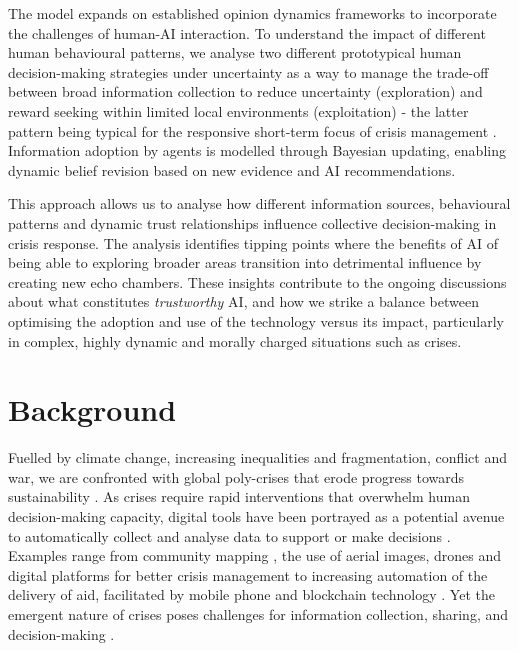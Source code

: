 \documentclass[pdflatex,sn-apa]{sn-jnl}%
\begin{document}
The model expands on established opinion dynamics frameworks \citep{geschke2019triple} to incorporate the challenges of human-AI interaction. To understand the impact of different human behavioural patterns, we analyse two different prototypical human decision-making strategies under uncertainty as a way to manage the trade-off between broad information collection to reduce uncertainty (exploration) and reward seeking within limited local environments (exploitation) - the latter pattern being typical for the responsive short-term focus of crisis management \citep{comes2020coordination}. Information adoption by agents is modelled through Bayesian updating, enabling dynamic belief revision based on new evidence and AI recommendations.

This approach allows us to analyse how different information sources, behavioural patterns and dynamic trust relationships influence collective decision-making in crisis response. The analysis identifies tipping points where the benefits of AI of being able to exploring broader areas transition into detrimental influence by creating new echo chambers. These insights contribute to the ongoing discussions about what constitutes \textit{trustworthy} AI, and how we strike a balance between optimising the adoption and use of the technology versus its impact, particularly in complex, highly dynamic and morally charged situations such as crises.

\section{Background}

Fuelled by climate change, increasing inequalities and fragmentation, conflict and war, we are confronted with global poly-crises that erode progress towards sustainability \citep{sogaard2024evolution}. As crises require rapid interventions that overwhelm human decision-making capacity, digital tools have been portrayed as a potential avenue to automatically collect and analyse data to support or make decisions \citep{qadir2016crisis}. Examples range from community mapping \citep{champlin2023measuring, soden2014crowdsourced}, the use of aerial images, drones and digital platforms for better crisis management \citep{voigt2007satellite} to increasing automation of the delivery of aid, facilitated by mobile phone and blockchain technology \citep{coughlan2015forecast, baharmand2019leveraging}. Yet the emergent nature of crises poses challenges for information collection, sharing, and decision-making \citep{turoff2004design, nespeca2020towards}.
\end{document}
